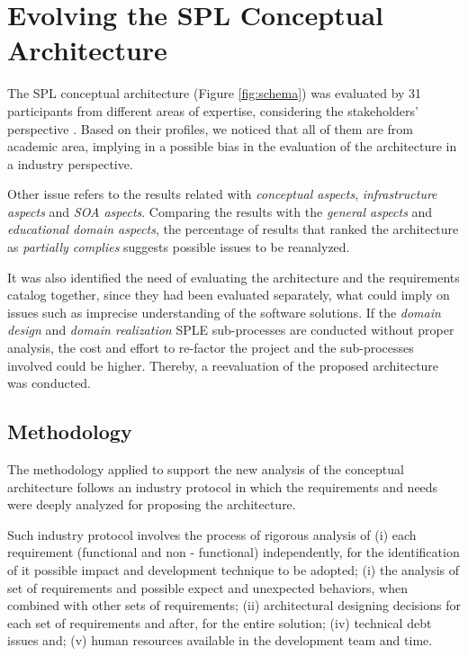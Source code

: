 
\section{Evolving the SPL Conceptual Architecture}
\label{sec:spl_project}

The SPL conceptual architecture (Figure \ref{fig:schema}) was evaluated by 31 participants from different areas of expertise, considering the stakeholders' perspective \cite{marcolinoarcht2017}. Based on their profiles, we noticed that all of them are from academic area, implying in a possible bias in the evaluation of the architecture in a industry perspective.

Other issue refers to the results related with \textit{conceptual aspects}, \textit{infrastructure aspects} and \textit{SOA aspects}. Comparing the results with the \textit{general aspects} and \textit{educational domain aspects}, the percentage of results that ranked the architecture as \textit{partially complies} suggests possible issues to be reanalyzed. 

It was also identified the need of evaluating the architecture and the requirements catalog together, since they had been evaluated separately, what could imply on issues such as imprecise understanding of the software solutions. If the \textit{domain design} and \textit{domain realization} SPLE sub-processes are conducted without proper analysis, the cost and effort to re-factor the project and the sub-processes involved could be higher. Thereby, a reevaluation of the proposed architecture was conducted.


\subsection{Methodology}

The methodology applied to support the new analysis of the conceptual architecture follows an industry protocol in which the requirements and needs were deeply analyzed for proposing the architecture.

Such industry protocol involves the process of rigorous analysis of (i) each requirement (functional and non - functional) independently, for the identification of it possible impact and development technique to be adopted; (i) the analysis of set of requirements and possible expect and unexpected behaviors, when combined with other sets of requirements; (ii) architectural designing decisions for each set of requirements and after, for the entire solution; (iv) technical debt issues and; (v) human resources available in the development team and time.


